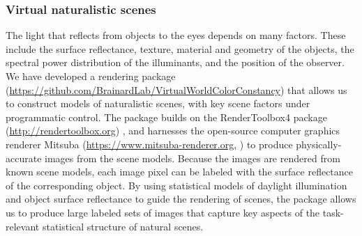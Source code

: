 \documentclass{jov}
\begin{document}
\subsubsection{Virtual naturalistic scenes}
The light that reflects from objects to the eyes depends on many factors.
These include the surface reflectance, texture, material and geometry of the objects, 
the spectral power distribution of the illuminants, and the position of the observer.
We have developed a rendering package 
(\href{https://github.com/BrainardLab/VirtualWorldColorConstancy}{https://github.com/BrainardLab/VirtualWorldColorConstancy}) 
that allows us to construct models of naturalistic scenes, with key scene factors under programmatic control.
The package builds on the RenderToolbox4 package (\href{http://rendertoolbox.org}{http://rendertoolbox.org}) \cite{heasly2014rendertoolbox3},
and harnesses the open-source computer graphics renderer Mitsuba (\href{https://www.mitsuba-renderer.org}{https://www.mitsuba-renderer.org}, 
) to produce physically-accurate images from the scene models.
Because the images are rendered from known scene models, each image pixel can be labeled with 
the surface reflectance of the corresponding object.
By using statistical models of daylight illumination and object surface reflectance to guide the rendering of scenes, 
the package allows us to produce large labeled sets of images that capture key aspects of the task-relevant 
statistical structure of natural scenes.
\end{document}
